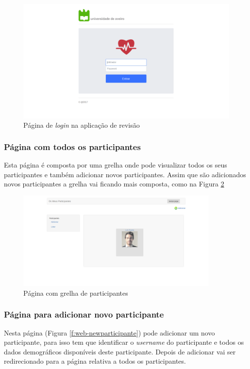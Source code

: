 \begin{figure}[H]
\centering
\includegraphics[width=1\textwidth]{imgs/login_web.png}
\caption[Página de \textit{login} na aplicação de revisão]{Página de \textit{login} na aplicação de revisão}
\label{f:web-login}
\end{figure}

\subsubsection{Página com todos os participantes}
Esta página é composta por uma grelha onde pode visualizar todos os seus participantes e também adicionar novos participantes. Assim que são adicionados novos participantes a grelha vai ficando mais composta, como na Figura \ref{f:gridParticipante}

\begin{figure}[H]
\centering
\includegraphics[width=0.9\textwidth]{imgs/list_after_add_web.png}
\caption[Página com grelha de participantes]{Página com grelha de participantes}
\label{f:gridParticipante}
\end{figure}


\subsubsection{Página para adicionar novo participante}
Nesta página (Figura \ref{f:web-newparticipante}) pode adicionar um novo participante, para isso tem que identificar o \textit{username} do participante e todos os dados demográficos disponíveis deste participante. Depois de adicionar vai ser redirecionado para a página relativa a todos os participantes. 

